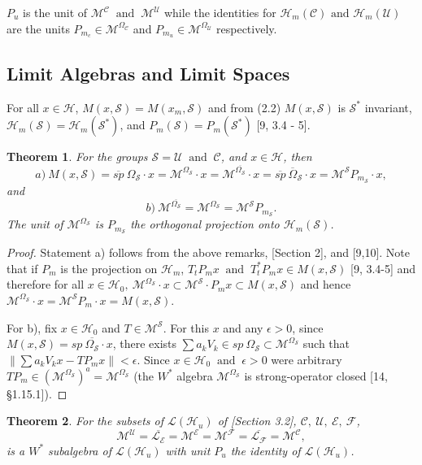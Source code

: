 \documentclass[req no]{amsart}[16pt]
\theoremstyle{plain}
\newtheorem{theorem}{Theorem}[section]
\theoremstyle{definition}
\numberwithin{equation}{section}\setcounter{page}{1}
\def\m{\mbox}
\def\ma{\m{ and }}
\def\O{\Omega}
\def\h{\mathcal{H}}
\def\E {\mathcal{E}}
\def\L {\mathcal{L}}
\def\M {\mathcal{M}}
\def\F {\mathcal{F}}
\def\s{\mathcal{S}}
\def\C{\mathcal{C}}
\def\U{\mathcal{U}}
\begin{document}
$P_{u}$ is the unit of $\M^{\C}~\ma~\M^{\U}$ while the identities for $\h_{m}(\C) \ma \h_{m}(\U)$ are the units $P_{m_{c}} \in \M^{\O_{\C}}$ and $P_{m_{u}} \in \M^{\O_{\U}}$ respectively.

\subsection{Limit Algebras and Limit Spaces}
For all $x \in \h$, $M(x,\s) = M(x_{m},\s)$ and from (2.2) $M(x,\s)$ is $\s^{*}$ invariant, $\h_{m}(\s)=\h_{m}(\s^{*})$, and $P_{m}(\s)=P_{m}(\s^{*})$ [9, 3.4 - 5].

\begin{theorem} For the groups $\s = \U ~ \ma ~ \C$, and $ x \in \h$, then $$a)~M(x,\s)=\overline{sp}~\Omega_{\s} \cdot x=\M^{\O_{\s}}\cdot x = \M ^{\overline{\O_{\s}}}\cdot x = \overline{sp}~\overline{\O}_{\s} \cdot x = \mathcal{M}^{\s} P_{m_{\s}} \cdot x,$$ and $$b)~\M^{\overline{\O_{\s}}} = \M^{\O_{\s}} =\mathcal{M}^{\s} P_{m_{\s}}.$$ The unit of $\M^{\O_{\s}}$ is $P_{m_{\s}}$ the orthogonal projection onto $\h_{m}(\s)$.
\end{theorem}

\begin{proof}
  Statement a) follows from the above remarks, [Section 2], and [9,10]. Note that if $P_{m}$ is the projection on $\h_{m}$, $T_{t}P_{m}x~\ma~ T_{t}^{*}P_{m}x \in M(x,\s)$ [9, 3.4-5] and therefore for all $x \in \h_{0}, ~\M^{\O_{\s}}\cdot x \subset \mathcal{M}^{\s}\cdot P_{m}x \subset  M(x,\s)$ and hence $\M^{\Omega_{\s}} \cdot x =  \M^{\s}P_{m} \cdot x = M(x,\s)$.

For b), fix $x \in \h_{0}$ and $T \in \M^{\s}$. For this $x$ and any $\epsilon > 0$, since $M(x, \s)= \overline{sp~\Omega_{\s}\cdot x}$, there exists $\sum a_{k}V_{k} \in sp ~\Omega_{\s} \subset \M^{\Omega_{\s}}$ such that $\|\sum a_{k}V_{k}x - TP_{m}x\|< \epsilon$. Since $x \in \h_{0}~ \ma~\epsilon > 0$ were arbitrary $TP_{m} \in (\M^{\Omega_{\s}})^{a} = \M^{\Omega_{\s}} $ (the $W^{*}$ algebra $\M^{\Omega_{\s}}$ is strong-operator closed [14, \S  1.15.1]).
\end{proof}
\begin{theorem}For the subsets of $\L(\h_{u})$ of [Section 3.2], $\mathcal{C},~ \mathcal{U},~ \E,~ \F$,
$$\M^\mathcal{U}=\overline{\mathcal{L}_{\mathcal{E}}}=\M^\mathcal{E} = \M^\mathcal{F}=\overline{\mathcal{L}_{\mathcal{F}}} =\M^\mathcal{C},$$
is a $W^*$ subalgebra of $\L(\h_{u})$ with unit $P_{u}$ the identity of $\L(\h_{u})$.
\end{theorem}
\end{document}
